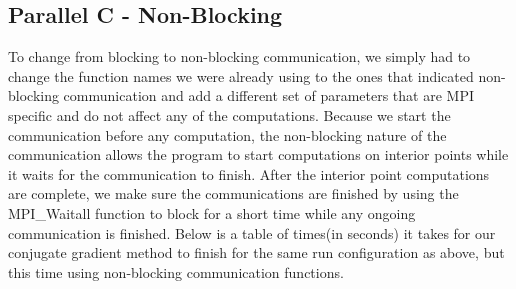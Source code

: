 \documentclass[11pt]{article}
\begin{document}
\subsection{Parallel C - Non-Blocking}
To change from blocking to non-blocking communication, we simply had to change the function names we were already using to the ones that indicated non-blocking communication and add a different set of parameters that are MPI specific and do not affect any of the computations. Because we start the communication before any computation, the non-blocking nature of the communication allows the program to start computations on interior points while it waits for the communication to finish. After the interior point computations are complete, we make sure the communications are finished by using the MPI\_Waitall function to block for a short time while any ongoing communication is finished. Below is a table of times(in seconds) it takes for our conjugate gradient method to finish for the same run configuration as above, but this time using non-blocking communication functions.
\end{document}
